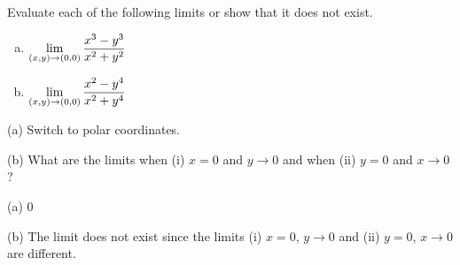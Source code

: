 \begin{question}[M2226 2009D] %
Evaluate each of the following limits or show that it does not exist.
\begin{enumerate}[(a)]
\item
$\displaystyle\lim_{(x,y)\rightarrow (0,0)}\frac{x^3-y^3}{x^2+y^2}$
\item
$\displaystyle\lim_{(x,y)\rightarrow (0,0)}\frac{x^2-y^4}{x^2+y^4}$
\end{enumerate}
\end{question}

\begin{hint}
(a) Switch to polar coordinates.

(b) What are the limits when (i) $x=0$ and $y\rightarrow 0$ and when
(ii) $y=0$ and $x\rightarrow 0$?
\end{hint}

\begin{answer}
(a) $0$

(b) The limit does not exist since the limits (i) $x=0$,
$y\rightarrow 0$ and (ii) $y=0$, $x\rightarrow 0$ are different.
\end{answer}

